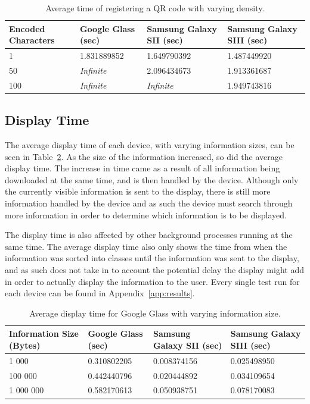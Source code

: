 	\begin{table}[H]%
    		\caption{Average time of registering a QR code with varying density.} \label{tab:complexityAverage}
		\centering \begin{tabularx}{\textwidth}{l|X|X|X} \hline
		\textbf{Encoded Characters} & \textbf{Google Glass (sec)} & \textbf{Samsung Galaxy SII (sec)} & \textbf{Samsung Galaxy SIII (sec)} \\ \hline \hline
       
		1	&1.831889852	&1.649790392	&1.487449920	\\ \hline
		50	&\textit{Infinite}	&2.096434673	&1.913361687	\\ \hline
		100	&\textit{Infinite}	&\textit{Infinite}	&1.949743816	\\ \hline
		
		\end{tabularx}
	\end{table}

\subsection{Display Time}

The average display time of each device, with varying information sizes, can be seen in Table~\ref{tab:averageDisplaySpeedGoogleGlass}. As the size of the information increased, so did the average display time. The increase in time came as a result of all information being downloaded at the same time, and is then handled by the device. Although only the currently visible information is sent to the display, there is still more information handled by the device and as such the device must search through more information in order to determine which information is to be displayed. 

The display time is also affected by other background processes running at the same time. The average display time also only shows the time from when the information was sorted into classes until the information was sent to the display, and as such does not take in to account the potential delay the display might add in order to actually display the information to the user. Every single test run for each device can be found in Appendix~\ref{app:results}.

	\begin{table}[ht!]
    		\caption{Average display time for Google Glass with varying information size.} \label{tab:averageDisplaySpeedGoogleGlass}
		\centering \begin{tabularx}{\textwidth}{l|X|X|X} \hline
		\textbf{Information Size (Bytes)} & \textbf{Google Glass (sec)}  & \textbf{Samsung Galaxy SII (sec)}  & \textbf{Samsung Galaxy SIII (sec)} \\ \hline \hline
       
		1 000	&0.310802205	&0.008374156	&0.025498950	 \\ \hline
		100 000 	&0.442440796	&0.020444892	&0.034109654	 \\ \hline
		1 000 000	&0.582170613	&0.050938751	&0.078170083	 \\ \hline

		\end{tabularx}
	\end{table}


